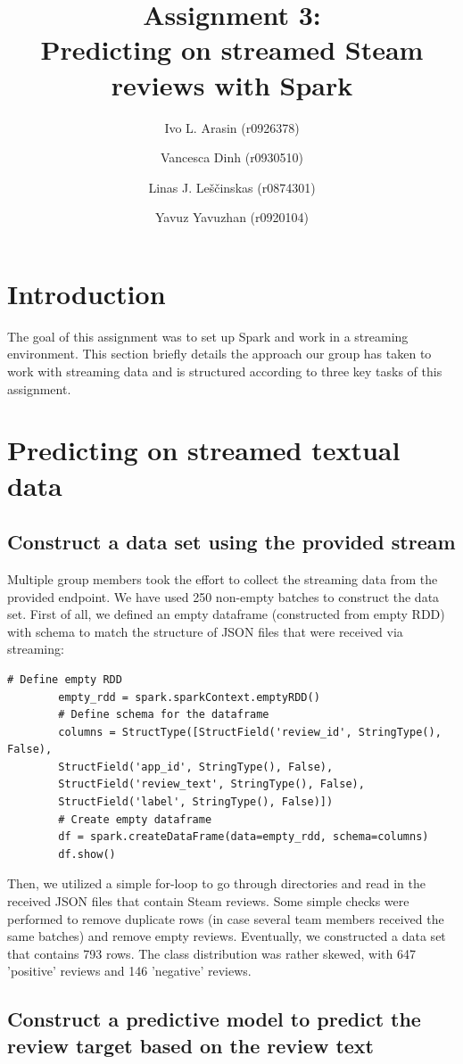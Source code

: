 \documentclass[11pt, oneside]{article}   	%
\title{Assignment 3: \\ Predicting on streamed Steam reviews with Spark}
\author{\centering Ivo L. Arasin (r0926378) \and Vancesca Dinh (r0930510) \and Linas J. Leščinskas (r0874301) \and Yavuz Yavuzhan (r0920104)}
\begin{document}
	\maketitle
	\section{Introduction}
	
	The goal of this assignment was to set up Spark and work in a streaming environment. This section briefly details the approach our group has taken to work with streaming data and is structured according to three key tasks of this assignment. 
	
	\section{Predicting on streamed textual data}
	
		\subsection{Construct a data set using the provided stream}
		Multiple group members took the effort to collect the streaming data from the provided endpoint. We have used 250 non-empty batches to construct the data set.
		First of all, we defined an empty dataframe (constructed from empty RDD) with schema to match the structure of JSON files that were received via streaming:
		
		\begin{lstlisting}[style=mystyle]
		# Define empty RDD
		empty_rdd = spark.sparkContext.emptyRDD()
		# Define schema for the dataframe
		columns = StructType([StructField('review_id', StringType(), False),
		StructField('app_id', StringType(), False), 
		StructField('review_text', StringType(), False), 
		StructField('label', StringType(), False)])
		# Create empty dataframe
		df = spark.createDataFrame(data=empty_rdd, schema=columns)
		df.show()
		\end{lstlisting}
		
		\noindent Then, we utilized a simple for-loop to go through directories and read in the received JSON files that contain Steam reviews. Some simple checks were performed to remove duplicate rows (in case several team members received the same batches) and remove empty reviews. Eventually, we constructed a data set that contains 793 rows. The class distribution was rather skewed, with 647 'positive' reviews and 146 'negative' reviews.
		
		\subsection{Construct a predictive model to predict the review target based on the review text}
		
\end{document}
